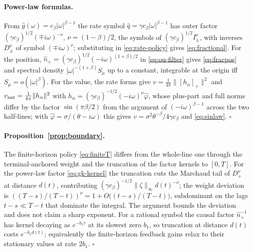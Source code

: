 \documentclass[11pt]{article}
\newcommand{\pluspart}[1]{\left[#1\right]_+}
\theoremstyle{plain}
\theoremstyle{definition}
\theoremstyle{remark}
\begin{document}
\paragraph{Power-law formulas.} From $\hat g(\omega)=c_\beta|\omega|^{\beta-1}$ the rate symbol $\hat q=\gamma c_\beta|\omega|^{\beta-1}$ has outer factor $(\gamma c_\beta)^{1/2}(\mp i\omega)^{-\nu}$, $\nu=(1-\beta)/2$, the symbols of $(\gamma c_\beta)^{1/2}I^\nu_\pm$, with inverses $D^\nu_\pm$ of symbol $(\mp i\omega)^\nu$; substituting in \eqref{eq:rate-policy} gives \eqref{eq:fractional}. For the position, $\hat n_+=(\gamma c_\beta)^{1/2}(-i\omega)^{(1+\beta)/2}$ in \eqref{eq:ou-filter} gives \eqref{eq:fracpos} and spectral density $|\omega|^{-(1+\beta)}S_\mu$ up to a constant, integrable at the origin iff $S_\mu=o(|\omega|^\beta)$. For the value, the rate forms give $v=\tfrac1{4\pi}\|\pluspart{h_\alpha}\|^2$ and $v_{\rm ant}=\tfrac1{4\pi}\|h_\alpha\|^2$ with $h_\alpha=(\gamma c_\beta)^{-1/2}(-i\omega)^\nu\hat\varphi$, whose plus-part and full norms differ by the factor $\sin(\pi\beta/2)$ from the argument of $(-i\omega)^{\beta-1}$ across the two half-lines; with $\hat\varphi=\sigma/(\theta-i\omega)$ this gives $v=\sigma^2\theta^{-\beta}/4\gamma c_\beta$ and \eqref{eq:sinlaw}. $\square$

\paragraph{Proposition~\ref{prop:boundary}.} The finite-horizon policy \eqref{eq:finiteT} differs from the whole-line one through the terminal-anchored weight and the truncation of the factor kernels to $[0,T]$. For the power-law factor \eqref{eq:gk-kernel} the truncation cuts the Marchaud tail of $D^\nu_+$ at distance $d(t)$, contributing $(\gamma c_\beta)^{-1/2}\|\zeta\|_\infty d(t)^{-\nu}$; the weight deviation is $((T-s)/(T-t))^\nu=1+O\bigl((t-s)/(T-t)\bigr)$, subdominant on the lags $t-s\ll T-t$ that dominate the integral. The argument bounds the deviation and does not claim a sharp exponent. For a rational symbol the causal factor $\hat n_+^{-1}$ has kernel decaying as $e^{-b_1\tau}$ at its slowest zero $b_1$, so truncation at distance $d(t)$ costs $e^{-b_1 d(t)}$; equivalently the finite-horizon feedback gains relax to their stationary values at rate $2b_1$. $\square$
\end{document}
